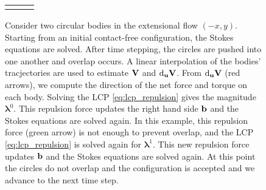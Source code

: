 \begin{figure}[!h]
\begin{center}
\begin{tabular}{c c c}
\begin{minipage}{0.35\textwidth}
\end{minipage}
\end{tabular}
\end{center}
\caption[Collision resolution]{Consider two circular bodies in the extensional flow $(-x,y)$. Starting from an initial contact-free configuration, the Stokes equations are solved. After time stepping, the circles are pushed into one another and overlap occurs. A linear interpolation of the bodies' tracjectories are used to estimate ${\mathbf{V}}$ and $\text{d}_{\mathbf{u}}{\mathbf{V}}$. From $\text{d}_{\mathbf{u}}{\mathbf{V}}$ (red arrows), we compute the direction of the net force and torque on each body. Solving the LCP \eqref{eq:lcp_repulsion} gives the magnitude $\bm{\lambda}^0$. This repulsion force updates the right hand side ${\mathbf{b}}$ and the Stokes equations are solved again. In this example, this repulsion force (green arrow) is not enough to prevent overlap, and the LCP \eqref{eq:lcp_repulsion} is solved again for $\bm{\lambda}^1$. This new repulsion force updates ${\mathbf{b}}$ and the Stokes equations are solved again. At this point the circles do not overlap and the configuration is accepted and we advance to the next time step.}\label{fig:contact_resolution}
\end{figure}

